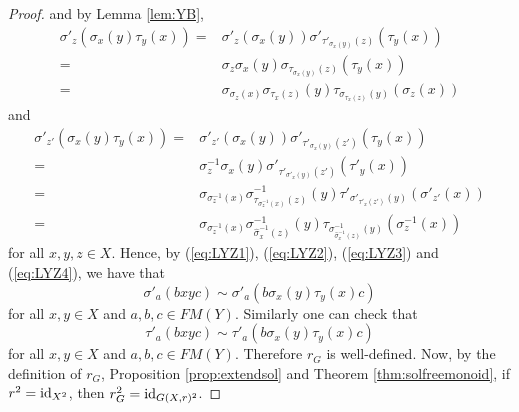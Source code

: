 \begin{proof}
and by Lemma \ref{lem:YB},
\begin{align}\label{eq:LYZ3}
    \sigma'_z(\sigma_x(y)\tau_y(x))=&\sigma'_z(\sigma_x(y))\sigma'_{\tau'_{\sigma_x(y)}(z)}(\tau_y(x))\nonumber\\
    =&\sigma_z\sigma_x(y)\sigma_{\tau_{\sigma_x(y)}(z)}(\tau_y(x))\nonumber\\
    =&\sigma_{\sigma_z(x)}\sigma_{\tau_x(z)}(y)\tau_{\sigma_{\tau_x(z)}(y)}(\sigma_z(x))
\end{align}
and 
\begin{align}\label{eq:LYZ4}
    \sigma'_{z'}(\sigma_x(y)\tau_y(x))=&\sigma'_{z'}(\sigma_x(y))\sigma'_{\tau'_{\sigma_x(y)}(z')}(\tau_y(x))\nonumber\\
    =&\sigma^{-1}_z\sigma_x(y)\sigma'_{\tau'_{\sigma'_x(y)}(z')}(\tau'_y(x))\nonumber\\
    =&\sigma_{\sigma^{-1}_z(x)}\sigma^{-1}_{\tau_{\sigma^{-1}_z(x)}(z)}(y)\tau'_{\sigma'_{\tau'_x(z')}(y)}(\sigma'_{z'}(x))\nonumber\\
    =&\sigma_{\sigma^{-1}_z(x)}\sigma^{-1}_{\widehat{\sigma}^{-1}_x(z)}(y)\tau_{\sigma^{-1}_{\widehat{\sigma}^{-1}_x(z)}(y)}(\sigma^{-1}_{z}(x))
\end{align}
for all $x,y,z\in X$. 
Hence, by (\ref{eq:LYZ1}), (\ref{eq:LYZ2}), (\ref{eq:LYZ3}) and (\ref{eq:LYZ4}), we have that 
\[\sigma'_{a}(bxyc)\sim \sigma'_a(b\sigma_x(y)\tau_y(x)c)\]
for all $x,y\in X$ and $a,b,c\in FM(Y)$. Similarly one can check that
\[\tau'_{a}(bxyc)\sim \tau'_a(b\sigma_x(y)\tau_y(x)c)\]
for all $x,y\in X$ and $a,b,c\in FM(Y)$. Therefore $r_G$ is well-defined. Now, by the definition of $r_G$, Proposition \ref{prop:extendsol} and Theorem \ref{thm:solfreemonoid}, if $r^2=\operatorname{id}_{X^2}$, then $r_G^2=\operatorname{id}_{G(X,r)^2}$. 


\end{proof}
